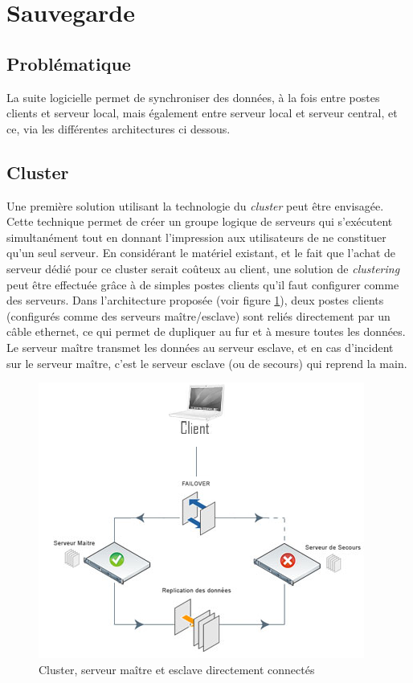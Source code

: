 \section{Sauvegarde}\label{SauvegardeTechnique}

% 

\subsection{Problématique}
La suite logicielle permet de synchroniser des données, à la fois entre postes clients et serveur local, mais également entre serveur local et serveur central, et ce, via les différentes architectures ci dessous.

\subsection{Cluster}
Une première solution utilisant la technologie du \emph{cluster} peut être envisagée. Cette technique permet de créer un groupe logique de serveurs qui s'exécutent simultanément tout en donnant l'impression aux utilisateurs de ne constituer qu'un seul serveur.
En considérant le matériel existant, et le fait que l'achat de serveur dédié pour ce cluster serait coûteux au client, une solution de \emph{clustering} peut être effectuée grâce à de simples postes clients qu'il faut configurer comme des serveurs.
Dans l'architecture proposée (voir figure \ref{SchemaCluster}), deux postes clients (configurés comme des serveurs maître/esclave) sont reliés directement par un câble ethernet, ce qui permet de dupliquer au fur et à mesure toutes les données.
Le serveur maître transmet les données au serveur esclave, et en cas d'incident sur le serveur maître, c'est le serveur esclave (ou de secours) qui reprend la main.

\begin{figure}[htbp]
	\centering
	\includegraphics[scale=0.9]{Images/SchemaCluster.png}
	\caption{Cluster, serveur maître et esclave directement connectés}
	\label{SchemaCluster}
\end{figure}

